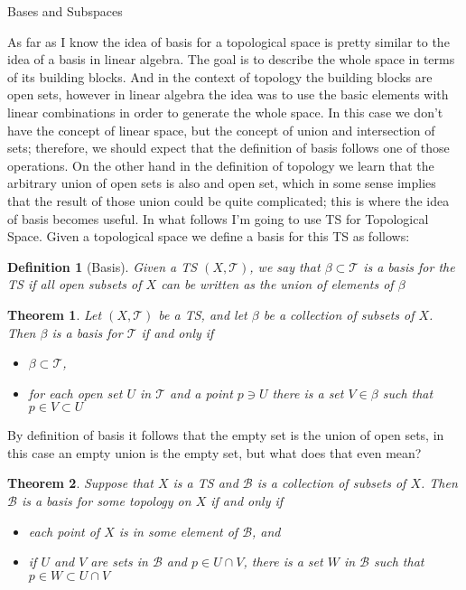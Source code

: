 \documentclass[12pt]{article}
\newtheorem{definition}{Definition}[section]
\newtheorem{theorem}{Theorem}[section]
\begin{document}
\begin{section}{Bases and Subspaces}

As far as I know the idea of basis for a topological space is pretty similar to the idea of a basis in linear algebra. The goal is to describe the whole space in terms of its building blocks. And in the context of topology the building blocks are open sets, however in linear algebra the idea was to use the basic elements with linear combinations in order to generate the whole space. In this case we don't have the concept of linear space, but the concept of union and intersection of sets; therefore, we should expect that the definition of basis follows one of those operations.
On the other hand in the definition of topology we learn that the arbitrary union of open sets is also and open set, which in some sense implies that the result of those union could be quite complicated; this is where the idea of basis becomes useful.
In what follows I'm going to use TS for Topological Space. Given a topological space we define a basis for this TS as follows:
\begin{definition}[Basis]
Given a TS $\left( X, \mathcal{T}\right)$, we say that $\mathcal{\beta}\subset\mathcal{T}$ is a basis for the TS if all open subsets of $X$ can be written as the union of elements of $\mathcal{\beta}$
\end{definition}

\begin{theorem}
Let $\left( X, \mathcal{T}\right)$ be a TS, and let $\mathcal{\beta}$ be a collection of subsets of $X$. Then $\mathcal{\beta}$ is a basis for $\mathcal{T}$ if and only if
	\begin{itemize}
		\item $\mathcal{\beta}\subset\mathcal{T}$,
		\item for each open set $U$ in $\mathcal{T}$ and a point $p\ni U$ there is a set $V\in\mathcal{\beta}$ such that $p\in V\subset U$
	\end{itemize}
\end{theorem}

\begin{tcolorbox}
By definition of basis it follows that the empty set is the union of open sets, in this case an empty union is the empty set, but what does that even mean?
\end{tcolorbox}

\begin{theorem}
Suppose that $X$ is a TS and $\mathcal{B}$ is a collection of subsets of $X$. Then $\mathcal{B}$ is a basis for some topology on $X$ if and only if 
	\begin{itemize}
		\item each point of $X$ is in some element of $\mathcal{B}$, and
		\item if $U$ and $V$ are sets in $\mathcal{B}$ and $p\in U\cap V$, there is a set $W$ in $\mathcal{B}$ such that $p\in W\subset U\cap V$
	\end{itemize}
\end{theorem}


\end{section}
\end{document}
